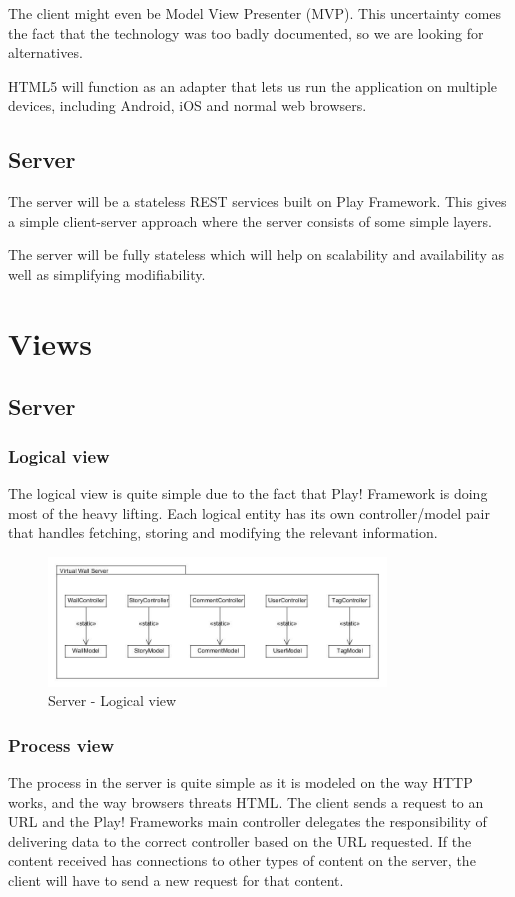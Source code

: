 \documentclass[11pt]{book}
\begin{document}
The client might even be Model View Presenter (MVP). This uncertainty comes the fact that the technology was too badly documented, so we are looking for alternatives.

HTML5 will function as an adapter that lets us run the application on multiple devices, including Android, iOS and normal web browsers.

\subsection{Server}
The server will be a stateless REST services built on Play Framework. This gives a simple client-server approach where the server consists of some simple layers.

The server will be fully stateless which will help on scalability and availability as well as simplifying modifiability.

\section{Views}

\subsection{Server}

\subsubsection{Logical view}
The logical view is quite simple due to the fact that Play! Framework is doing most of the heavy lifting. Each logical entity has its own controller/model pair that handles fetching, storing and modifying the relevant information.

\begin{figure}[H]
      \centering
      \includegraphics[width=0.8\textwidth]{Figures/Architecture/serverLogical.jpg}
      \caption{Server - Logical view}
      \label{fig:arch_server_logical}
\end{figure}

\subsubsection{Process view}
The process in the server is quite simple as it is modeled on the way HTTP works, and the way browsers threats HTML. The client sends a request to an URL and the Play! Frameworks main controller delegates the  responsibility of delivering data to the correct controller based on the URL requested. If the content received has connections to other types of content on the server, the client will have to send a new request for that content.
\end{document}
